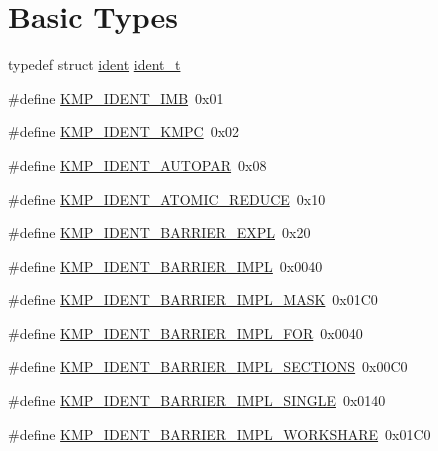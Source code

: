 \hypertarget{group__BASIC__TYPES}{\section{Basic Types}
\label{group__BASIC__TYPES}
}
\begin{DoxyCompactItemize}
\item 
typedef struct \hyperlink{structident}{ident} \hyperlink{group__BASIC__TYPES_ga690fda6b92f039a72db263c6b4394ddb}{ident\-\_\-t}
\item 
\#define \hyperlink{group__BASIC__TYPES_ga951d8a0a41a4b285b3da9cabd7a99f85}{K\-M\-P\-\_\-\-I\-D\-E\-N\-T\-\_\-\-I\-M\-B}~0x01
\item 
\#define \hyperlink{group__BASIC__TYPES_ga50e3ecb5eb8d70f437a84a8b2bc9e88f}{K\-M\-P\-\_\-\-I\-D\-E\-N\-T\-\_\-\-K\-M\-P\-C}~0x02
\item 
\#define \hyperlink{group__BASIC__TYPES_ga744ef043bd848d5e338b4c72ef247adc}{K\-M\-P\-\_\-\-I\-D\-E\-N\-T\-\_\-\-A\-U\-T\-O\-P\-A\-R}~0x08
\item 
\#define \hyperlink{group__BASIC__TYPES_gaf2f9e5d03f9f38651a3b8d5ef8635d44}{K\-M\-P\-\_\-\-I\-D\-E\-N\-T\-\_\-\-A\-T\-O\-M\-I\-C\-\_\-\-R\-E\-D\-U\-C\-E}~0x10
\item 
\#define \hyperlink{group__BASIC__TYPES_ga7358cc60d0f006b36752a1795e6d5d93}{K\-M\-P\-\_\-\-I\-D\-E\-N\-T\-\_\-\-B\-A\-R\-R\-I\-E\-R\-\_\-\-E\-X\-P\-L}~0x20
\item 
\#define \hyperlink{group__BASIC__TYPES_gaaffb56f3d5bd8803b41e9862e2aeb863}{K\-M\-P\-\_\-\-I\-D\-E\-N\-T\-\_\-\-B\-A\-R\-R\-I\-E\-R\-\_\-\-I\-M\-P\-L}~0x0040
\item 
\#define \hyperlink{group__BASIC__TYPES_ga051912580fd00d979784f32030f9bd77}{K\-M\-P\-\_\-\-I\-D\-E\-N\-T\-\_\-\-B\-A\-R\-R\-I\-E\-R\-\_\-\-I\-M\-P\-L\-\_\-\-M\-A\-S\-K}~0x01\-C0
\item 
\#define \hyperlink{group__BASIC__TYPES_ga6b3fc6e45180c05f05f8e2a96e76ad7d}{K\-M\-P\-\_\-\-I\-D\-E\-N\-T\-\_\-\-B\-A\-R\-R\-I\-E\-R\-\_\-\-I\-M\-P\-L\-\_\-\-F\-O\-R}~0x0040
\item 
\#define \hyperlink{group__BASIC__TYPES_gaf586645df3ec08ef49e830f4bc811ccf}{K\-M\-P\-\_\-\-I\-D\-E\-N\-T\-\_\-\-B\-A\-R\-R\-I\-E\-R\-\_\-\-I\-M\-P\-L\-\_\-\-S\-E\-C\-T\-I\-O\-N\-S}~0x00\-C0
\item 
\#define \hyperlink{group__BASIC__TYPES_ga969dfa670f3319e6464d9b6aa0e04159}{K\-M\-P\-\_\-\-I\-D\-E\-N\-T\-\_\-\-B\-A\-R\-R\-I\-E\-R\-\_\-\-I\-M\-P\-L\-\_\-\-S\-I\-N\-G\-L\-E}~0x0140
\item 
\#define \hyperlink{group__BASIC__TYPES_ga2fe81fc0d3864d3ba43e042c5a2c98f7}{K\-M\-P\-\_\-\-I\-D\-E\-N\-T\-\_\-\-B\-A\-R\-R\-I\-E\-R\-\_\-\-I\-M\-P\-L\-\_\-\-W\-O\-R\-K\-S\-H\-A\-R\-E}~0x01\-C0
\end{DoxyCompactItemize}
